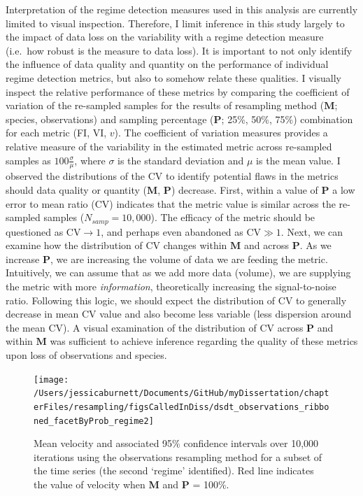 \documentclass[12pt,twoside,openany]{reedthesis}
\begin{document}
Interpretation of the regime detection measures used in this analysis are currently limited to visual inspection. Therefore, I limit inference in this study largely to the impact of data loss on the variability with a regime detection measure (i.e.~how robust is the measure to data loss). It is important to not only identify the influence of data quality and quantity on the performance of individual regime detection metrics, but also to somehow relate these qualities. I visually inspect the relative performance of these metrics by comparing the coefficient of variation of the re-sampled samples for the results of resampling method (\(\textbf{M}\); species, observations) and sampling percentage (\(\textbf{P}\); 25\%, 50\%, 75\%) combination for each metric (FI, VI, \(v\)). The coefficient of variation measures provides a relative measure of the variability in the estimated metric across re-sampled samples as \(100\frac{\sigma}{\mu}\), where \(\sigma\) is the standard deviation and \(\mu\) is the mean value.
I observed the distributions of the CV to identify potential flaws in the metrics should data quality or quantity (\(\textbf{M}\), \(\textbf{P}\)) decrease. First, within a value of \(\textbf{P}\) a low error to mean ratio (CV) indicates that the metric value is similar across the re-sampled samples (\(N_{samp}=10,000\)). The efficacy of the metric should be questioned as CV\(\rightarrow 1\), and perhaps even abandoned as CV\(\gg1\). Next, we can examine how the distribution of CV changes within \(\textbf{M}\) and across \(\textbf{P}\). As we increase \(\textbf{P}\), we are increasing the volume of data we are feeding the metric. Intuitively, we can assume that as we add more data (volume), we are supplying the metric with more \emph{information}, theoretically increasing the signal-to-noise ratio. Following this logic, we should expect the distribution of CV to generally decrease in mean CV value and also become less variable (less dispersion around the mean CV). A visual examination of the distribution of CV across \(\textbf{P}\) and within \(\textbf{M}\) was sufficient to achieve inference regarding the quality of these metrics upon loss of observations and species.\\

\begin{figure}
\texttt{[image: /Users/jessicaburnett/Documents/GitHub/myDissertation/chapterFiles/resampling/figsCalledInDiss/dsdt\_observations\_ribboned\_facetByProb\_regime2]} \caption{Mean velocity and associated 95\% confidence intervals over 10,000 iterations using the observations resampling method for a subset of the time series (the second `regime' identified). Red line indicates the value of velocity when \textbf{M} and \textbf{P} = 100\%.}\label{fig:dsdtResampRegime2}
\end{figure}
\end{document}
